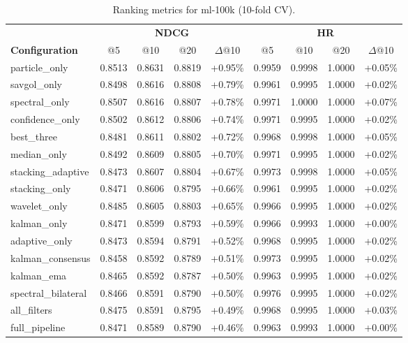 \begin{table}[htbp]
\centering
\caption{Ranking metrics for ml-100k (10-fold CV).}
\label{tab:ranking-ml-100k}
\begin{adjustbox}{max width=\textwidth}
\begin{tabular}{l cccc cccc}
\toprule
& \multicolumn{4}{c}{\textbf{NDCG}} & \multicolumn{4}{c}{\textbf{HR}} \\
\cmidrule(lr){2-5} \cmidrule(lr){6-9}
\textbf{Configuration} & @5 & @10 & @20 & $\Delta$@10 & @5 & @10 & @20 & $\Delta$@10 \\
\midrule
particle\_only & 0.8513 & 0.8631 & 0.8819 & +0.95\% & 0.9959 & 0.9998 & 1.0000 & +0.05\% \\
savgol\_only & 0.8498 & 0.8616 & 0.8808 & +0.79\% & 0.9961 & 0.9995 & 1.0000 & +0.02\% \\
spectral\_only & 0.8507 & 0.8616 & 0.8807 & +0.78\% & 0.9971 & 1.0000 & 1.0000 & +0.07\% \\
confidence\_only & 0.8502 & 0.8612 & 0.8806 & +0.74\% & 0.9971 & 0.9995 & 1.0000 & +0.02\% \\
best\_three & 0.8481 & 0.8611 & 0.8802 & +0.72\% & 0.9968 & 0.9998 & 1.0000 & +0.05\% \\
median\_only & 0.8492 & 0.8609 & 0.8805 & +0.70\% & 0.9971 & 0.9995 & 1.0000 & +0.02\% \\
stacking\_adaptive & 0.8473 & 0.8607 & 0.8804 & +0.67\% & 0.9973 & 0.9998 & 1.0000 & +0.05\% \\
stacking\_only & 0.8471 & 0.8606 & 0.8795 & +0.66\% & 0.9961 & 0.9995 & 1.0000 & +0.02\% \\
wavelet\_only & 0.8485 & 0.8605 & 0.8803 & +0.65\% & 0.9966 & 0.9995 & 1.0000 & +0.02\% \\
kalman\_only & 0.8471 & 0.8599 & 0.8793 & +0.59\% & 0.9966 & 0.9993 & 1.0000 & +0.00\% \\
adaptive\_only & 0.8473 & 0.8594 & 0.8791 & +0.52\% & 0.9968 & 0.9995 & 1.0000 & +0.02\% \\
kalman\_consensus & 0.8458 & 0.8592 & 0.8789 & +0.51\% & 0.9973 & 0.9995 & 1.0000 & +0.02\% \\
kalman\_ema & 0.8465 & 0.8592 & 0.8787 & +0.50\% & 0.9963 & 0.9995 & 1.0000 & +0.02\% \\
spectral\_bilateral & 0.8466 & 0.8591 & 0.8790 & +0.50\% & 0.9976 & 0.9995 & 1.0000 & +0.02\% \\
all\_filters & 0.8475 & 0.8591 & 0.8795 & +0.49\% & 0.9968 & 0.9995 & 1.0000 & +0.03\% \\
full\_pipeline & 0.8471 & 0.8589 & 0.8790 & +0.46\% & 0.9963 & 0.9993 & 1.0000 & +0.00\% \\

\end{tabular}
\end{adjustbox}
\end{table}
